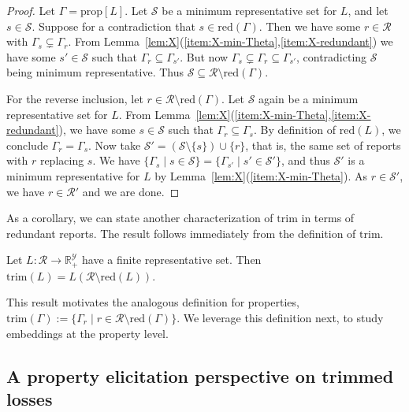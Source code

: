 \documentclass[twoside,11pt]{article}
\newcommand{\reals}{\mathbb{R}}
\newcommand{\prop}[1]{\mathrm{prop}[#1]}
\newcommand{\R}{\mathcal{R}}
\newcommand{\Sc}{\mathcal{S}}
\newcommand{\Y}{\mathcal{Y}}
\newcommand{\trim}{\mathrm{trim}}
\newcommand{\red}{\mathrm{red}}
\newcommand{\trimred}{\mathrm{trim}}
\newcommand{\trimcover}{\mathrm{trim}}
\begin{document}
\begin{proof}
  Let $\Gamma = \prop L$.
  Let $\Sc$ be a minimum representative set for $L$, and let $s\in\Sc$.
  Suppose for a contradiction that $s\in\red(\Gamma)$.
  Then we have some $r\in\R$ with $\Gamma_s \subsetneq \Gamma_r$.
  From Lemma~\ref{lem:X}(\ref{item:X-min-Theta},\ref{item:X-redundant}) we have some $s'\in\Sc$ such that $\Gamma_r \subseteq \Gamma_{s'}$.
  But now $\Gamma_s \subsetneq \Gamma_r \subseteq \Gamma_{s'}$, contradicting $\Sc$ being minimum representative.
  Thus $\Sc \subseteq \R \setminus \red(\Gamma)$.

  For the reverse inclusion, let $r\in\R\setminus\red(\Gamma)$.
  Let $\Sc$ again be a minimum representative set for $L$.
  From Lemma~\ref{lem:X}(\ref{item:X-min-Theta},\ref{item:X-redundant}), we have some $s\in\Sc$ such that $\Gamma_r \subseteq \Gamma_s$.
  By definition of $\red(L)$, we conclude $\Gamma_r = \Gamma_s$.
  Now take $\Sc' = (\Sc \setminus \{s\}) \cup \{r\}$, that is, the same set of reports with $r$ replacing $s$.
  We have $\{\Gamma_s \mid s\in\Sc\} = \{\Gamma_{s'} \mid s'\in\Sc'\}$, and thus $\Sc'$ is a minimum representative for $L$ by Lemma~\ref{lem:X}(\ref{item:X-min-Theta}).
  As $r\in\Sc'$, we have $r \in \R'$ and we are done.
\end{proof}


As a corollary, we can state another characterization of $\trim$ in terms of redundant reports.
The result follows immediately from the definition of $\trim$.

\begin{corollary}\label{cor:trim-loss-red}
  Let $L : \R \to \reals^\Y_+$ have a finite representative set.
  Then $\trimcover(L) = L(\R \setminus \red(L))$.
\end{corollary}

This result motivates the analogous definition for properties, $\trimred(\Gamma) := \{\Gamma_r \mid r \in \R\setminus\red(\Gamma)\}$.
We leverage this definition next, to study embeddings at the property level.

\subsection{A property elicitation perspective on trimmed losses}
\label{sec:prop-trim}
\end{document}
